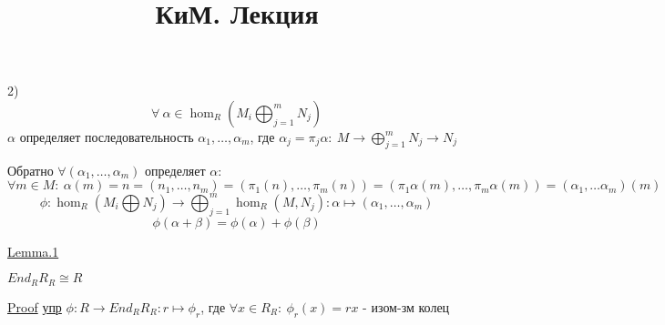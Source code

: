\documentclass[a4paper]{article}
\begin{document}
\title{КиМ. Лекция}
\maketitle

\begin{tcolorbox}
    2)
    \[
        \forall \ \alpha \in \hom_{R}\left(M_i \bigoplus_{j=1}^{m} N_j\right)
    \]
    $ \alpha $ определяет последовательность $ \alpha_1, \dots , \alpha_m $,
    где $ \alpha_j = \pi_j \alpha: \ M \to \bigoplus_{j=1}^{m}N_j \to N_j $ 

    Обратно $ \forall ( \alpha_1, \dots , \alpha_m) $ определяет $ \alpha $:
    \[
        \forall m \in M: \ \alpha(m) = n = (n_1, \dots, n_m) = (\pi_1(n), \dots,
        \pi_m(n)) = (\pi_1 \alpha(m), \dots, \pi_m \alpha(m)) = (\alpha_1, \dots
        \alpha_m)(m)
    \]
    \[
        \phi: \hom_R\left(M_i \bigoplus N_j\right) \to \bigoplus_{j=1}^{m} \hom_R(M, N_j): 
        \alpha \mapsto (\alpha_1, \dots, \alpha_m)
    \]
    \[
        \phi(\alpha + \beta) = \phi(\alpha) + \phi(\beta)
    \]
\end{tcolorbox}

\begin{tcolorbox}
\underline{Lemma.1}

$ End_R R_R \cong R $ 

\underline{Proof} \underline{упр} $ \phi: R \to End_R R_R: r \mapsto \phi_r $,
где $ \forall x \in R_R: \ \phi_r(x) = rx $ - изом-зм колец 
\end{tcolorbox}
\end{document}
